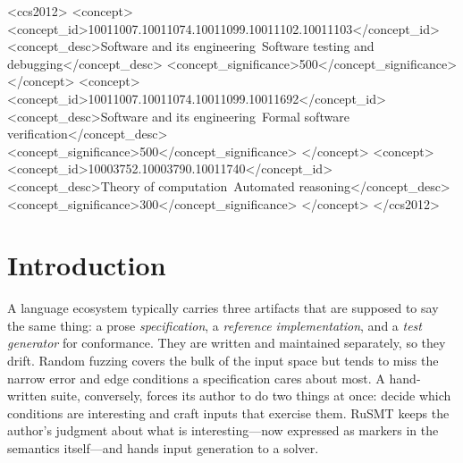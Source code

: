 \documentclass[sigplan,review,anonymous]{acmart}
\theoremstyle{definition}
\theoremstyle{remark}
\newcommand{\rusmt}{RuSMT}
\begin{document}

\begin{CCSXML}
<ccs2012>
<concept>
<concept_id>10011007.10011074.10011099.10011102.10011103</concept_id>
<concept_desc>Software and its engineering~Software testing and debugging</concept_desc>
<concept_significance>500</concept_significance>
</concept>
<concept>
<concept_id>10011007.10011074.10011099.10011692</concept_id>
<concept_desc>Software and its engineering~Formal software verification</concept_desc>
<concept_significance>500</concept_significance>
</concept>
<concept>
<concept_id>10003752.10003790.10011740</concept_id>
<concept_desc>Theory of computation~Automated reasoning</concept_desc>
<concept_significance>300</concept_significance>
</concept>
</ccs2012>
\end{CCSXML}


\maketitle

\section{Introduction}
\label{sec:intro}

A language ecosystem typically carries three artifacts that are supposed to say
the same thing: a prose \emph{specification}, a \emph{reference implementation},
and a \emph{test generator} for conformance. They are written and maintained
separately, so they drift. Random fuzzing covers the bulk of the input space but
tends to miss the narrow error and edge conditions a specification cares about
most. A hand-written suite, conversely, forces its author to do two things at
once: decide which conditions are interesting and craft inputs that exercise
them. \rusmt{} keeps the author's judgment about what is interesting---now
expressed as markers in the semantics itself---and hands input generation to a
solver.
\end{document}
